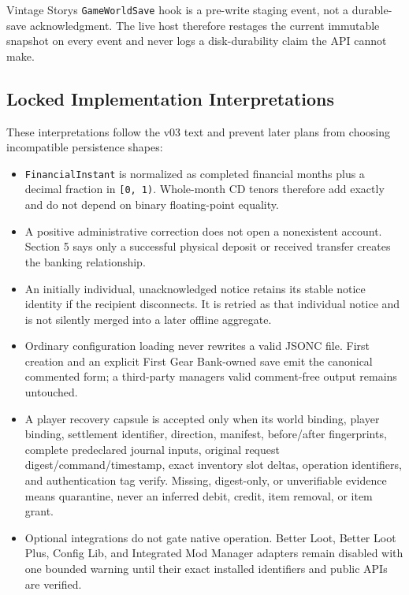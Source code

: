 \documentclass[
  9pt,
  letterpaper,
]{extarticle}
\newcommand{\passthrough}[1]{#1}
\newcounter{none} %
\providecommand{\tightlist}{%
  \setlength{\itemsep}{0pt}\setlength{\parskip}{0pt}}
\begin{document}
Vintage Story\textquotesingle s \passthrough{\lstinline!GameWorldSave!}
hook is a pre-write staging event, not a durable-save acknowledgment.
The live host therefore restages the current immutable snapshot on every
event and never logs a disk-durability claim the API cannot make.

\subsection{Locked Implementation
Interpretations}\label{locked-implementation-interpretations}

These interpretations follow the v03 text and prevent later plans from
choosing incompatible persistence shapes:

\begin{itemize}
\tightlist
\item
  \passthrough{\lstinline!FinancialInstant!} is normalized as completed
  financial months plus a decimal fraction in
  \passthrough{\lstinline![0, 1)!}. Whole-month CD tenors therefore add
  exactly and do not depend on binary floating-point equality.
\item
  A positive administrative correction does not open a nonexistent
  account. Section 5 says only a successful physical deposit or received
  transfer creates the banking relationship.
\item
  An initially individual, unacknowledged notice retains its stable
  notice identity if the recipient disconnects. It is retried as that
  individual notice and is not silently merged into a later offline
  aggregate.
\item
  Ordinary configuration loading never rewrites a valid JSONC file.
  First creation and an explicit First Gear Bank-owned save emit the
  canonical commented form; a third-party manager\textquotesingle s
  valid comment-free output remains untouched.
\item
  A player recovery capsule is accepted only when its world binding,
  player binding, settlement identifier, direction, manifest,
  before/after fingerprints, complete predeclared journal inputs,
  original request digest/\allowbreak{}command/\allowbreak{}timestamp,
  exact inventory slot deltas, operation identifiers, and authentication
  tag verify. Missing, digest-only, or unverifiable evidence means
  quarantine, never an inferred debit, credit, item removal, or item
  grant.
\item
  Optional integrations do not gate native operation. Better Loot,
  Better Loot Plus, Config Lib, and Integrated Mod Manager adapters
  remain disabled with one bounded warning until their exact installed
  identifiers and public APIs are verified.
\end{itemize}
\end{document}
